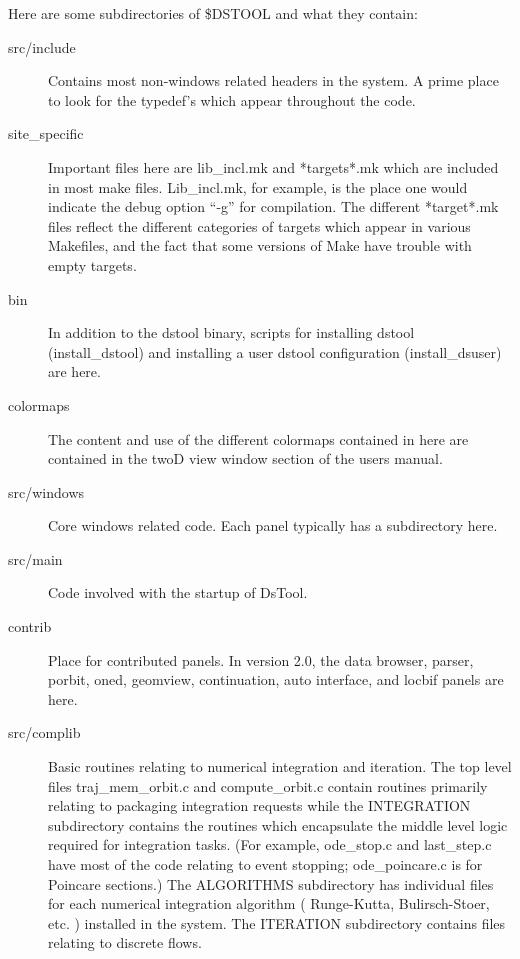 Here are some subdirectories of \$DSTOOL and what they contain:
\begin{description}


  \item[src/include] Contains most non-windows related headers in the 
	system. A prime place to look for the typedef's which appear 
	throughout the	code. 

  \item[site\_specific] Important files here are lib\_incl.mk
  and *targets*.mk which are included in most make files. Lib\_incl.mk,
  for example,  is the place one would indicate the debug option
  ``-g'' for compilation. The different *target*.mk files reflect
  the different categories of targets which appear in various Makefiles,
  and the fact that some versions of Make have trouble with empty targets.

  \item[bin] In addition to the dstool binary, scripts for
  installing dstool (install\_dstool) and installing a user 
  dstool configuration (install\_dsuser) are here.

  \item[colormaps] The content and use of the different colormaps
  contained in here are contained in the twoD view window
  section of the users manual.

  \item[src/windows] Core windows related code. Each panel typically
   has a subdirectory here.

  \item[src/main] Code involved with the startup of DsTool.

  \item[contrib] Place for contributed panels. In version 2.0,
  the data browser, parser, porbit, oned, geomview, continuation,
  auto interface, and locbif panels are here.

  \item[src/complib] Basic routines relating to
  numerical integration and iteration. The top level files
  traj\_mem\_orbit.c and compute\_orbit.c contain routines
  primarily relating to packaging integration requests while
  the INTEGRATION subdirectory contains the routines which
  encapsulate the middle level logic required for integration
  tasks. (For example, ode\_stop.c and last\_step.c have most of the 
  code relating to event stopping; ode\_poincare.c is for
  Poincare sections.) The ALGORITHMS subdirectory has individual
  files for each numerical integration algorithm ( Runge-Kutta,
  Bulirsch-Stoer, etc. ) installed in the system. The ITERATION
  subdirectory contains files relating to discrete flows.


\end{description}
